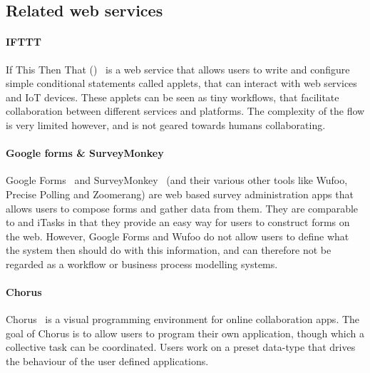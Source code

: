 \subsection{Related web services}


\paragraph{IFTTT}

If This Then That (\IFTTT)~\cite{IFTTT} is a web service that allows users to write and
configure simple conditional statements called applets, that can interact with
web services and IoT devices. These applets can be seen as tiny workflows, that
facilitate collaboration between different services and platforms. The
complexity of the flow is very limited however, and is not geared towards humans
collaborating.

\paragraph{Google forms \& SurveyMonkey}

Google Forms~\cite{googleforms} and SurveyMonkey~\cite{wufoo} (and their various other tools like Wufoo, Precise Polling and Zoomerang) are web based survey administration apps that allows
users to compose forms and gather data from them. They are comparable to \TOP and
iTasks in that they provide an easy way for users to construct forms on the web.
However, Google Forms and Wufoo do not allow users to define what the system
then should do with this information, and can therefore not be regarded as a
workflow or business process modelling systems.

\paragraph{Chorus} %

Chorus~\cite{chen2017chorus} is a visual programming environment for online
collaboration apps. The goal of Chorus is to allow users to program their own
application, though which a collective task can be coordinated. Users work on a
preset data-type that drives the behaviour of the user defined applications.
